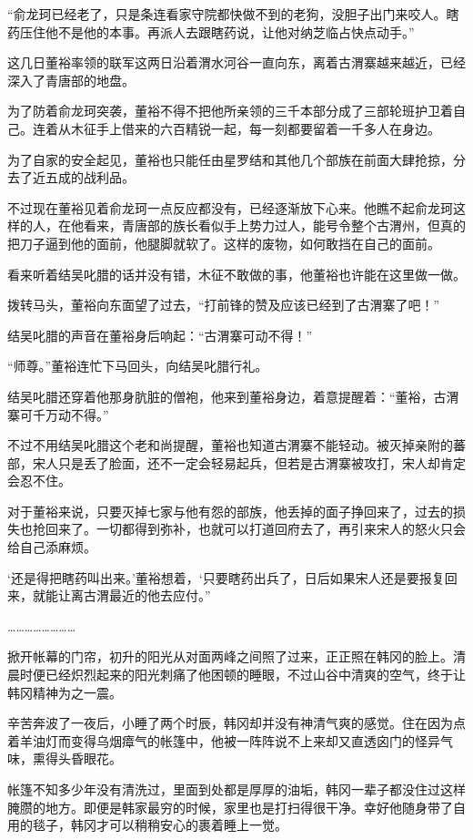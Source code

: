 “俞龙珂已经老了，只是条连看家守院都快做不到的老狗，没胆子出门来咬人。瞎药压住他不是他的本事。再派人去跟瞎药说，让他对纳芝临占快点动手。”

这几日董裕率领的联军这两日沿着渭水河谷一直向东，离着古渭寨越来越近，已经深入了青唐部的地盘。

为了防着俞龙珂突袭，董裕不得不把他所亲领的三千本部分成了三部轮班护卫着自己。连着从木征手上借来的六百精锐一起，每一刻都要留着一千多人在身边。

为了自家的安全起见，董裕也只能任由星罗结和其他几个部族在前面大肆抢掠，分去了近五成的战利品。

不过现在董裕见着俞龙珂一点反应都没有，已经逐渐放下心来。他瞧不起俞龙珂这样的人，在他看来，青唐部的族长看似手上势力过人，能号令整个古渭州，但真的把刀子逼到他的面前，他腿脚就软了。这样的废物，如何敢挡在自己的面前。

看来听着结吴叱腊的话并没有错，木征不敢做的事，他董裕也许能在这里做一做。

拨转马头，董裕向东面望了过去，“打前锋的赞及应该已经到了古渭寨了吧！”

结吴叱腊的声音在董裕身后响起：“古渭寨可动不得！”

“师尊。”董裕连忙下马回头，向结吴叱腊行礼。

结吴叱腊还穿着他那身肮脏的僧袍，他来到董裕身边，着意提醒着：“董裕，古渭寨可千万动不得。”

不过不用结吴叱腊这个老和尚提醒，董裕也知道古渭寨不能轻动。被灭掉亲附的蕃部，宋人只是丢了脸面，还不一定会轻易起兵，但若是古渭寨被攻打，宋人却肯定会忍不住。

对于董裕来说，只要灭掉七家与他有怨的部族，他丢掉的面子挣回来了，过去的损失也抢回来了。一切都得到弥补，也就可以打道回府去了，再引来宋人的怒火只会给自己添麻烦。

‘还是得把瞎药叫出来。’董裕想着，‘只要瞎药出兵了，日后如果宋人还是要报复回来，就能让离古渭最近的他去应付。”

……………………

掀开帐幕的门帘，初升的阳光从对面两峰之间照了过来，正正照在韩冈的脸上。清晨时便已经炽烈起来的阳光刺痛了他困顿的睡眼，不过山谷中清爽的空气，终于让韩冈精神为之一震。

辛苦奔波了一夜后，小睡了两个时辰，韩冈却并没有神清气爽的感觉。住在因为点着羊油灯而变得乌烟瘴气的帐篷中，他被一阵阵说不上来却又直透囟门的怪异气味，熏得头昏眼花。

帐篷不知多少年没有清洗过，里面到处都是厚厚的油垢，韩冈一辈子都没住过这样腌臜的地方。即便是韩家最穷的时候，家里也是打扫得很干净。幸好他随身带了自用的毯子，韩冈才可以稍稍安心的裹着睡上一觉。

